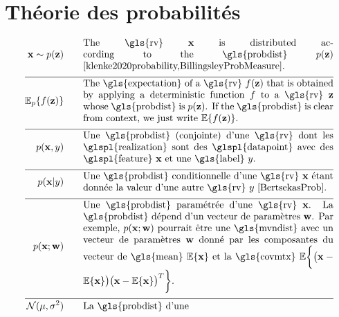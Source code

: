 \section*{Théorie des probabilités} 
\begin{align}
	\featurevec \sim p(\vz)  \quad\quad & \parbox{.75\textwidth}{The \gls{rv} $\featurevec$ is distributed according to 
	the \gls{probdist} $p(\vz)$ \cite{klenke2020probability,BillingsleyProbMeasure}. }  \nonumber \\[2mm] \hline \nonumber\\[-5mm]    
\expect_{p} \{ f(\datapoint) \}  \quad\quad & \parbox{.75\textwidth}{The \gls{expectation} of a \gls{rv} $f(\datapoint)$ that 
	is obtained by applying a deterministic function $f$ to a \gls{rv} 
	$\datapoint$ whose \gls{probdist} is $\prob{\datapoint}$. If the \gls{probdist} is clear from context, 
	we just write $\expect \{ f(\datapoint) \}$. }  \nonumber \\[2mm] \hline \nonumber\\[-5mm]     
	\prob{\featurevec,\truelabel} \quad\quad & \parbox{.75\textwidth}{Une \gls{probdist} (conjointe) d'une \gls{rv} 
		dont les \glspl{realization} sont des \glspl{datapoint} avec des \glspl{feature} $\featurevec$ et une \gls{label} $\truelabel$.} \nonumber        \nonumber \\[2mm] \hline \nonumber\\[-5mm]        
	\prob{\featurevec|\truelabel} \quad\quad & \parbox{.75\textwidth}{Une \gls{probdist} conditionnelle d'une \gls{rv} 
		$\featurevec$ étant donnée la valeur d'une autre \gls{rv} $\truelabel$ \cite[Sec.\ 3.5]{BertsekasProb}. } \nonumber       \nonumber \\[2mm] \hline \nonumber\\[-5mm]           
	\prob{\featurevec;\weights} \quad\quad & \parbox{.75\textwidth}{Une \gls{probdist} paramétrée d'une \gls{rv} $\featurevec$. 
		La \gls{probdist} dépend d'un vecteur de paramètres $\weights$. Par exemple, $\prob{\featurevec;\weights}$ pourrait être une 
		\gls{mvndist} avec un vecteur de paramètres $\weights$ donné par les composantes du vecteur de \gls{mean} $\expect \{ \featurevec \}$ 
		et la \gls{covmtx} $\expect \bigg \{ \big( \featurevec - \expect \{ \featurevec \}\big) \big( \featurevec - \expect \{ \featurevec \}\big)^{T}  \bigg\}$.} \nonumber           \nonumber \\[2mm] \hline \nonumber\\[-5mm]
	\mathcal{N}(\mu, \sigma^{2}) \quad\quad & \parbox{.75\textwidth}{La \gls{probdist} d'une 
}
\end{align}
